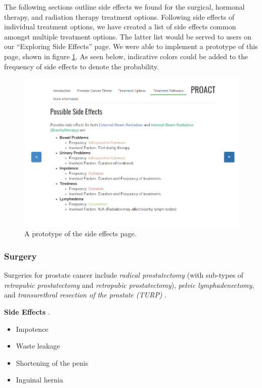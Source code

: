 \documentclass[journal]{vgtc}                %
\begin{document}
                The following sections outline side effects we found for the surgical, hormonal therapy, and radiation therapy treatment options.
                Following side effects of individual treatment options, we have created a list of side effects common amongst multiple treatment options.
                The latter list would be served to users on our ``Exploring Side Effects'' page. We were able to implement a prototype of this page, shown in figure \ref{fig:side}.
                As seen below, indicative colors could be added to the frequency of side effects to denote the probability.
                \begin{figure}[!ht]
                    \includegraphics[width=\columnwidth]{sideeffects.png}
                    \caption{A prototype of the side effects page.}
                    \label{fig:side}
                \end{figure}

                \subsubsection{Surgery}
                        Surgeries for prostate cancer include \textit{radical prostatectomy} (with sub-types of \textit{retropubic prostatectomy} and \textit{retropubic prostatectomy}), \textit{pelvic lymphadenectomy}, and \textit{transurethral resection of the prostate (TURP)} \cite{PDQProstateCancer:2016}.

                        \textbf{Side Effects} \cite{PDQProstateCancer:2016}.
                        \begin{itemize}
                            \item {Impotence}
                            \item {Waste leakage}
                            \item {Shortening of the penis}
                            \item {Inguinal hernia}
                        \end{itemize}
\end{document}
